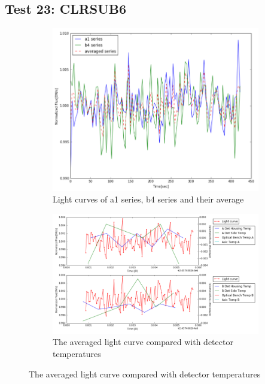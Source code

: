 \documentclass{aastex6}
\begin{document}
\subsection{Test 23: CLRSUB6} 
\begin{figure}[H]
    \centering
    \begin{subfigure}{1}
        \includegraphics[scale=0.4]{ts_test23}
        \caption{Light curves of a1 series, b4 series and their average}
    \end{subfigure}

    \begin{subfigure}{2}
        \includegraphics[scale=0.4]{temp_test23}
        \caption{The averaged light curve compared with detector temperatures}
    \end{subfigure}
   

\end{figure}
\end{document}
